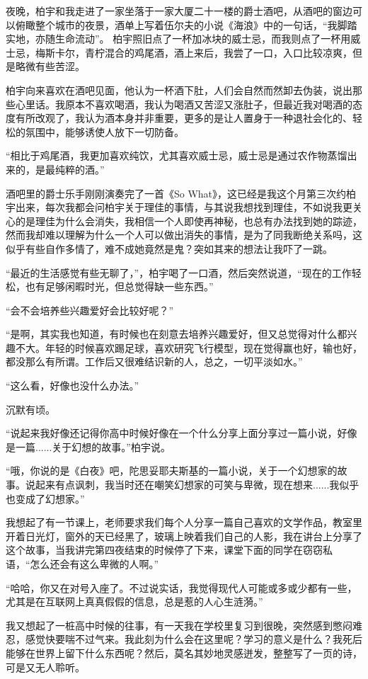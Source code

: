 夜晚，柏宇和我走进了一家坐落于一家大厦二十一楼的爵士酒吧，从酒吧的窗边可以俯瞰整个城市的夜景，酒单上写着伍尔夫的小说《海浪》中的一句话，“我脚踏实地，亦随生命流动”。 柏宇照旧点了一杯加冰块的威士忌，而我则点了一杯用威士忌，梅斯卡尔，青柠混合的鸡尾酒，酒上来后，我尝了一口，入口比较凉爽，但是略微有些苦涩。

柏宇向来喜欢在酒吧见面，他认为一杯酒下肚，人们会自然而然卸去伪装，说出那些心里话。我原本不喜欢喝酒，我认为喝酒又苦涩又涨肚子，但最近我对喝酒的态度有所改观了，我认为酒本身并非重要，更多的是让人置身于一种退社会化的、轻松的氛围中，能够诱使人放下一切防备。

“相比于鸡尾酒，我更加喜欢纯饮，尤其喜欢威士忌，威士忌是通过农作物蒸馏出来的，是最纯粹的酒。”

酒吧里的爵士乐手刚刚演奏完了一首《So What》，这已经是我这个月第三次约柏宇出来，每次我都会问柏宇关于理佳的事情，与其说我想找到理佳，不如说我更关心的是理佳为什么会消失，我相信一个人即使再神秘，也总有办法找到她的踪迹，然而我却难以理解为什么一个人可以做出消失的事情，是为了同我断绝关系吗，这似乎有些自作多情了，难不成她竟然是鬼？突如其来的想法让我吓了一跳。

“最近的生活感觉有些无聊了，”，柏宇喝了一口酒，然后突然说道，“现在的工作轻松，也有足够闲暇时光，但总觉得缺一些东西。”

“会不会培养些兴趣爱好会比较好呢？”

“是啊，其实我也知道，有时候也在刻意去培养兴趣爱好，但又总觉得对什么都兴趣不大。年轻的时候喜欢踢足球，喜欢研究飞行模型，现在觉得赢也好，输也好，都没那么有所谓。工作后又很难结识新的人，总之，一切平淡如水。”

“这么看，好像也没什么办法。”

沉默有顷。

“说起来我好像还记得你高中时候好像在一个什么分享上面分享过一篇小说，好像是一篇......关于幻想的故事。”柏宇说。

“哦，你说的是《白夜》吧，陀思妥耶夫斯基的一篇小说，关于一个幻想家的故事。说起来有点讽刺，我当时还在嘲笑幻想家的可笑与卑微，现在想来......我似乎也变成了幻想家。”

我想起了有一节课上，老师要求我们每个人分享一篇自己喜欢的文学作品，教室里开着日光灯，窗外的天已经黑了，玻璃上映着我们自己的人影，我在讲台上分享了这个故事，当我讲完第四夜结束的时候停了下来，课堂下面的同学在窃窃私语，“怎么还会有这么卑微的人啊。”

“哈哈，你又在对号入座了。不过说实话，我觉得现代人可能或多或少都有一些，尤其是在互联网上真真假假的信息，总是惹的人心生涟漪。”

我又想起了一桩高中时候的往事，有一天我在学校里复习到很晚，突然感到憋闷难忍，感觉快要喘不过气来。我此刻为什么会在这里呢？学习的意义是什么？我死后能够在世界上留下什么东西呢？然后，莫名其妙地灵感迸发，整整写了一页的诗，可是又无人聆听。

